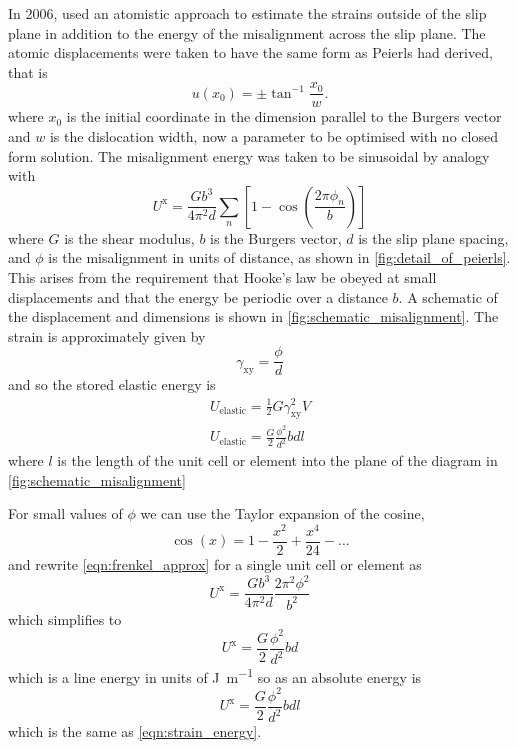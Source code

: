 In 2006, \citet{Clegg2006} used an atomistic approach to estimate the strains outside of the slip plane in addition to the energy of the misalignment across the slip plane. The atomic displacements were taken to have the same form as Peierls had derived, that is
\begin{equation}
u(x_0) = \pm \tan^{-1}\frac{x_0}{w}.
\end{equation}
where $x_0$ is the initial coordinate in the dimension parallel to the Burgers vector and $w$ is the dislocation width, now a parameter to be optimised with no closed form solution. The misalignment energy was taken to be sinusoidal by analogy with \citet{Frenkel1926}
\begin{equation}
U^{\text{x}} = \frac{Gb^3}{4\pi^2 d} \sum_n \left[ 1 - \cos \left(\frac{2\pi \phi_n}{b} \right)\right] \label{eqn:frenkel_approx}
\end{equation}
where $G$ is the shear modulus, $b$ is the Burgers vector, $d$ is the slip plane spacing, and $\phi$ is the misalignment in units of distance, as shown in \autoref{fig:detail_of_peierls}. This arises from the requirement that Hooke's law be obeyed at small displacements and that the energy be periodic over a distance $b$. A schematic of the displacement and dimensions is shown in \autoref{fig:schematic_misalignment}.
The strain is approximately given by 
\begin{equation}
\gamma_{\text{xy}} = \frac{\phi}{d}
\end{equation}
and so the stored elastic energy is 
\begin{align}
U_{\text{elastic}} = \frac{1}{2} G \gamma_{\text{xy}}^2 V \nonumber\\
U_{\text{elastic}} = \frac{G}{2} \frac{\phi^2}{d^2} b d l \label{eqn:strain_energy}
\end{align}
where $l$ is the length of the unit cell or element into the plane of the diagram in \autoref{fig:schematic_misalignment}

For small values of $\phi$ we can use the Taylor expansion of the cosine,
\begin{equation}
\cos(x) = 1 - \frac{x^2}{2} + \frac{x^4}{24} - \dots
\end{equation}
and rewrite \autoref{eqn:frenkel_approx} for a single unit cell or element as
\begin{equation}
U^{\text{x}} = \frac{Gb^3}{4\pi^2 d} \frac{2 \pi^2 \phi^2}{b^2}
\end{equation}
which simplifies to 
\begin{equation}
U^{\text{x}} = \frac{G}{2} \frac{\phi^2}{d^2} b d
\end{equation}
which is a line energy in units of \si{\joule\per\meter} so as an absolute energy is
\begin{equation}
U^{\text{x}} = \frac{G}{2} \frac{\phi^2}{d^2} b d l
\end{equation}
which is the same as \autoref{eqn:strain_energy}.










